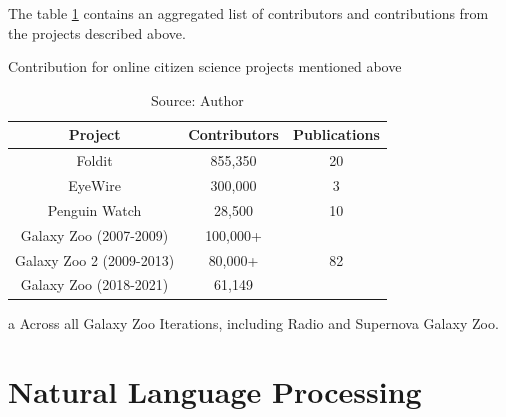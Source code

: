 The table \ref{tab:cs-contributions} contains an aggregated list of contributors and contributions from the projects described above.

\begin{table}[h]
\centering
\caption{Contribution for online citizen science projects mentioned above}
\label{tab:cs-contributions}
\begin{threeparttable}
    \small{
    \begin{tabular}{|c|c|c|}
        \hline 
        Project & Contributors & Publications \\ \hline
        Foldit & 855,350 \cite{foldit2021players} & 20 \cite{foldit2021publications} \\ \hline
        EyeWire & 300,000 \cite{eyewire2017players} & 3 \cite{eyewire2021publications} \\ \hline
        Penguin Watch & 28,500 \cite{penguin2021players} & 10 \cite{penguin2021publications} \\ \hline
        Galaxy Zoo (2007-2009) & 100,000+ \cite{lintott2011galaxy} & \multirow{3}{*}{82 \cite{galaxyzoo2021publications}\tnote{~a}} \\ \cline{1-2} 
        Galaxy Zoo 2 (2009-2013) & 80,000+ \cite{galaxyzoo22021volunteers} & \\ \cline{1-2} 
        Galaxy Zoo (2018-2021) & 61,149 \cite{galaxyzoo2021players} & \\ \hline 
    \end{tabular}}
    \begin{tablenotes}
        \item[a] Across all Galaxy Zoo Iterations, including Radio and Supernova Galaxy Zoo.
    \end{tablenotes}
\end{threeparttable}
\caption*{Source: Author}
\end{table}

\section{Natural Language Processing}

